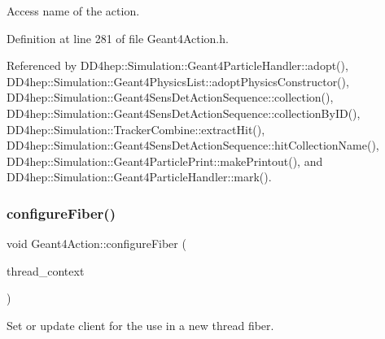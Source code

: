Access name of the action. 



Definition at line 281 of file Geant4\+Action.\+h.



Referenced by D\+D4hep\+::\+Simulation\+::\+Geant4\+Particle\+Handler\+::adopt(), D\+D4hep\+::\+Simulation\+::\+Geant4\+Physics\+List\+::adopt\+Physics\+Constructor(), D\+D4hep\+::\+Simulation\+::\+Geant4\+Sens\+Det\+Action\+Sequence\+::collection(), D\+D4hep\+::\+Simulation\+::\+Geant4\+Sens\+Det\+Action\+Sequence\+::collection\+By\+I\+D(), D\+D4hep\+::\+Simulation\+::\+Tracker\+Combine\+::extract\+Hit(), D\+D4hep\+::\+Simulation\+::\+Geant4\+Sens\+Det\+Action\+Sequence\+::hit\+Collection\+Name(), D\+D4hep\+::\+Simulation\+::\+Geant4\+Particle\+Print\+::make\+Printout(), and D\+D4hep\+::\+Simulation\+::\+Geant4\+Particle\+Handler\+::mark().

\hypertarget{class_d_d4hep_1_1_simulation_1_1_geant4_action_a6adc7138508303e4e417cb48a737ab19}{}\label{class_d_d4hep_1_1_simulation_1_1_geant4_action_a6adc7138508303e4e417cb48a737ab19} 
\subsubsection{\texorpdfstring{configure\+Fiber()}{configureFiber()}}
{\footnotesize\ttfamily void Geant4\+Action\+::configure\+Fiber (\begin{DoxyParamCaption}\item[{\hyperlink{class_d_d4hep_1_1_simulation_1_1_geant4_context}{Geant4\+Context} $\ast$}]{thread\+\_\+context }\end{DoxyParamCaption})\hspace{0.3cm}{\ttfamily [virtual]}}



Set or update client for the use in a new thread fiber. 



